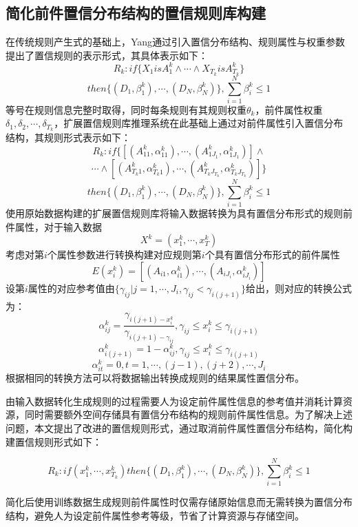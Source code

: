 \documentclass{cjc}
\begin{document}
\subsection{简化前件置信分布结构的置信规则库构建}
在传统规则产生式的基础上，Yang\cite{a3}通过引入置信分布结构、规则属性与权重参数提出了置信规则的表示形式，其具体表示如下：
$$R_k:if\{X_1isA_1^k \wedge \cdots \wedge X_{T_k}isA_{T_k}^k\}$$
$$then\{(D_1,\beta_1^k),\cdots,(D_N,\beta_N^k)\},\sum_{i=1}^N\beta_i^k\leq1$$
等号在规则信息完整时取得，同时每条规则有其规则权重$\theta_k$，前件属性权重$\delta_{1},\delta_{2},\cdots,\delta_{T_k}$，扩展置信规则库推理系统在此基础上通过对前件属性引入置信分布结构，其规则形式表示如下：
$$R_k:if\{[(A_{11}^k,\alpha_{11}^k),\cdots,(A_{1J_1}^k,\alpha_{1J_1}^k)] \wedge $$
$$\cdots \wedge [(A_{T_k1}^k,\alpha_{T_k1}^k), \cdots,(A_{T_kJ_{T_k}}^k,\alpha_{T_kJ_{T_k}}^k)]\}$$
$$then\{(D_1,\beta_1^k),\cdots,(D_N,\beta_N^k)\},\sum_{i=1}^N\beta_i^k\leq1$$
使用原始数据构建的扩展置信规则库将输入数据转换为具有置信分布形式的规则前件属性，对于输入数据
$$X^k=(x_1^k,\cdots,x_T^k)$$
考虑对第$i$个属性参数进行转换构建对应规则第$i$个具有置信分布形式的前件属性
$$E(x_i^k)=[(A_{i1},\alpha_{i1}^k),\cdots,(A_{iJ_i},\alpha_{iJ_i}^k)]$$
设第$i$属性的对应参考值由$\{\gamma_{ij}|j=1,\cdots,J_i,\gamma_{ij}<\gamma_{i(j+1)}\}$给出，则对应的转换公式为：
$$\alpha_{ij}^k=\frac{\gamma_{i(j+1)-x_i^k}}{\gamma_{i(j+1)-\gamma_{ij}}},\gamma_{ij}\leq x_i^k\leq \gamma_{i(j+1)}$$
$$\alpha_{i(j+1)}^k=1-\alpha_{ij}^k,\gamma_{ij}\leq x_i^k\leq \gamma_{i(j+1)}$$
$$\alpha_{it}^k=0,t=1,\cdots,(j-1),(j+2),\cdots,J_i$$
根据相同的转换方法可以将数据输出转换成规则的结果属性置信分布。

由输入数据转化生成规则的过程需要人为设定前件属性信息的参考值并消耗计算资源，同时需要额外空间存储具有置信分布结构的规则前件属性信息。为了解决上述问题，本文提出了改进的置信规则形式，通过取消前件属性置信分布结构，简化构建置信规则形式如下：
\begin{small}
	$$R_k:if(x_1^k , \cdots , x_{T_k}^k)then\{(D_1,\beta_1^k),\cdots,(D_N,\beta_N^k)\},\sum_{i=1}^N\beta_i^k\leq1$$	
\end{small}
简化后使用训练数据生成规则前件属性时仅需存储原始信息而无需转换为置信分布结构，避免人为设定前件属性参考等级，节省了计算资源与存储空间。
\end{document}
